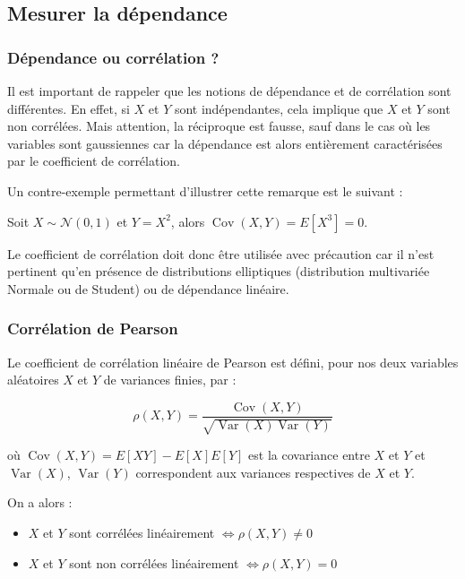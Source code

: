 \subsection{Mesurer la dépendance}

\subsubsection{Dépendance ou corrélation ?}

Il est important de rappeler que les notions de dépendance et de corrélation sont différentes.
En effet, si $X$ et $Y$ sont indépendantes, cela implique que $X$ et $Y$ sont non corrélées. Mais attention, la réciproque est fausse, sauf dans
le cas où les variables sont gaussiennes car la dépendance est alors entièrement caractérisées par le coefficient de corrélation.

Un contre-exemple permettant d'illustrer cette remarque est le suivant :

Soit $X \sim \mathcal{N}(0,1)$ et $Y = X^2$, alors $\operatorname{Cov}(X,Y) = E[X^3] = 0$.

Le coefficient de corrélation doit donc être utilisée avec précaution car il n’est pertinent qu’en présence de distributions elliptiques (distribution multivariée
Normale ou de Student) ou de dépendance linéaire.


\subsubsection{Corrélation de Pearson}

Le coefficient de corrélation linéaire de Pearson est défini, pour nos deux variables aléatoires $X$ et $Y$ de variances finies, par :

$$
\rho(X,Y) = \frac{\operatorname{Cov}(X,Y)}{\sqrt{ \operatorname{Var}(X) \operatorname{Var}(Y)}}
$$

où $\operatorname{Cov}(X,Y) = E[XY] - E[X] E[Y]$ est la covariance entre $X$ et $Y$ et $\operatorname{Var}(X)$, $\operatorname{Var}(Y)$ correspondent aux variances respectives
de $X$ et $Y$.

On a alors :

\begin{itemize}
\item $X$ et $Y$ sont corrélées linéairement $\Longleftrightarrow \rho(X,Y) \neq 0$
\item $X$ et $Y$ sont non corrélées linéairement $\Longleftrightarrow \rho(X,Y) = 0$
\end{itemize}

